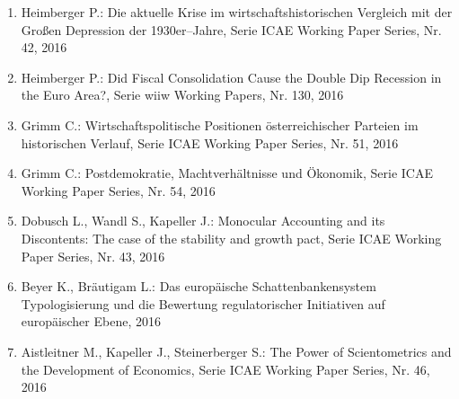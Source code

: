 \begin{enumerate}
	 \item Heimberger P.: Die aktuelle Krise im wirtschaftshistorischen Vergleich mit der Großen Depression der 1930er--Jahre, Serie ICAE Working Paper Series, Nr. 42, 2016
	 \item Heimberger P.: Did Fiscal Consolidation Cause the Double Dip Recession in the Euro Area?, Serie wiiw Working Papers, Nr. 130, 2016
	 \item Grimm C.: Wirtschaftspolitische Positionen österreichischer Parteien im historischen Verlauf, Serie ICAE Working Paper Series, Nr. 51, 2016
	 \item Grimm C.: Postdemokratie, Machtverhältnisse und Ökonomik, Serie ICAE Working Paper Series, Nr. 54, 2016
	 \item Dobusch L., Wandl S., Kapeller J.: Monocular Accounting and its Discontents: The case of the stability and growth pact, Serie ICAE Working Paper Series, Nr. 43, 2016
	 \item Beyer K., Bräutigam L.: Das europäische Schattenbankensystem Typologisierung und die Bewertung regulatorischer Initiativen auf europäischer Ebene, 2016
	 \item Aistleitner M., Kapeller J., Steinerberger S.: The Power of Scientometrics and the Development of Economics, Serie ICAE Working Paper Series, Nr. 46, 2016
\end{enumerate}
